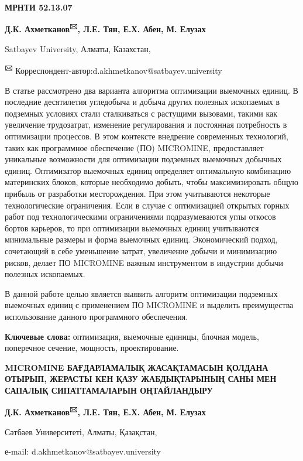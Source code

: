 \newpage
{\bfseries МРНТИ 52.13.07}


\begin{center}
{\bfseries Д.К. Ахметканов\textsuperscript{🖂}, Л.Е. Тян, Е.Х. Абен, М. Елузах}

Satbayev University, Алматы, Казахстан,

{\bfseries \textsuperscript{🖂}}
Корреспондент-автор:d.akhmetkanov@satbayev.university
\end{center}

В статье рассмотрено два варианта алгоритма оптимизации выемочных
единиц. В последние десятилетия угледобыча и добыча других полезных
ископаемых в подземных условиях стали сталкиваться с растущими вызовами,
такими как увеличение трудозатрат, изменение регулирования и постоянная
потребность в оптимизации процессов. В этом контексте внедрение
современных технологий, таких как программное обеспечение (ПО)
MICROMINE, предоставляет уникальные возможности для оптимизации
подземных выемочных добычных единиц. Оптимизатор выемочных единиц
определяет оптимальную комбинацию материнских блоков, которые необходимо
добыть, чтобы максимизировать общую прибыль от разработки месторождения.
При этом учитываются некоторые технологические ограничения. Если в
случае с оптимизацией открытых горных работ под технологическими
ограничениями подразумеваются углы откосов бортов карьеров, то при
оптимизации выемочных единиц учитываются минимальные размеры и форма
выемочных единиц. Экономический подход, сочетающий в себе уменьшение
затрат, увеличение добычи и минимизацию рисков, делает ПО MICROMINE
важным инструментом в индустрии добычи полезных ископаемых.

В данной работе целью является выявить алгоритм оптимизации подземных
выемочных единиц с применением ПО MICROMINE и выделить преимущества
использование данного программного обеспечения.

{\bfseries Ключевые слова:} оптимизация, выемочные единицы, блочная модель,
поперечное сечение, мощность, проектирование.

\begin{center}
{\large\bfseries MICROMINE БАҒДАРЛАМАЛЫҚ ЖАСАҚТАМАСЫН ҚОЛДАНА ОТЫРЫП, ЖЕРАСТЫ КЕН
ҚАЗУ ЖАБДЫҚТАРЫНЫҢ САНЫ МЕН САПАЛЫҚ СИПАТТАМАЛАРЫН ОҢТАЙЛАНДЫРУ}

{\bfseries Д.К. Ахметканов\textsuperscript{🖂}, Л.Е. Тян, Е.Х. Абен, М.
Елузах}

Сәтбаев Университеті, Алматы, Қазақстан,

е-mail: d.akhmetkanov@satbayev.university
\end{center}

